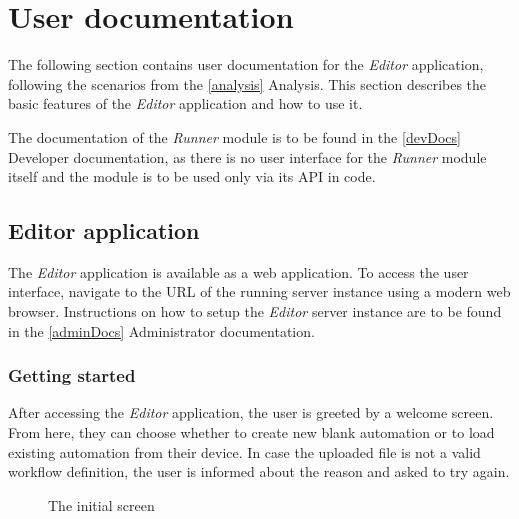 \section{User documentation}

The following section contains user documentation for the \textit{Editor} application, following the scenarios from the \autoref{analysis} Analysis.
This section describes the basic features of the \textit{Editor} application and how to use it.

The documentation of the \textit{Runner} module is to be found in the \autoref{devDocs} Developer documentation, as there is no user interface for the \textit{Runner} module itself and the module is to be used only via its \ac{API} in code.

\subsection{Editor application}

The \textit{Editor} application is available as a web application.
To access the user interface, navigate to the URL of the running server instance using a modern web browser.
Instructions on how to setup the \textit{Editor} server instance are to be found in the \autoref{adminDocs} Administrator documentation.

\subsubsection{Getting started}

After accessing the \textit{Editor} application, the user is greeted by a welcome screen.
From here, they can choose whether to create new blank automation or to load existing automation from their device.
In case the uploaded file is not a valid workflow definition, the user is informed about the reason and asked to try again.

\begin{figure}[!h]
    \begin{center}
    \end{center}
    \caption{The initial screen}
\end{figure}
\clearpage

